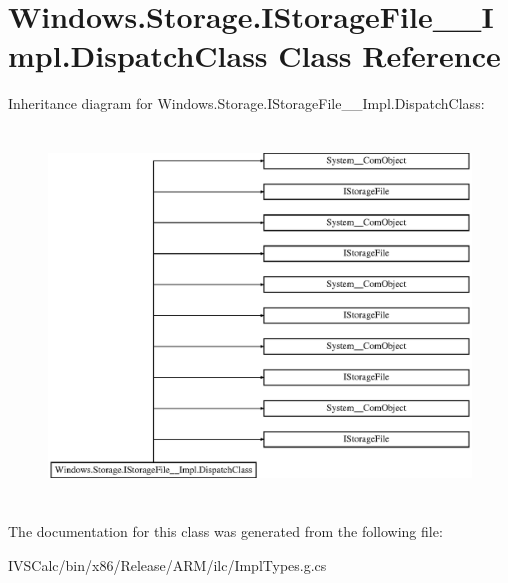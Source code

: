 \hypertarget{class_windows_1_1_storage_1_1_i_storage_file_____impl_1_1_dispatch_class}{}\section{Windows.\+Storage.\+I\+Storage\+File\+\_\+\+\_\+\+Impl.\+Dispatch\+Class Class Reference}
\label{class_windows_1_1_storage_1_1_i_storage_file_____impl_1_1_dispatch_class}
Inheritance diagram for Windows.\+Storage.\+I\+Storage\+File\+\_\+\+\_\+\+Impl.\+Dispatch\+Class\+:\begin{figure}[H]
\begin{center}
\leavevmode
\includegraphics[height=9.935484cm]{class_windows_1_1_storage_1_1_i_storage_file_____impl_1_1_dispatch_class}
\end{center}
\end{figure}


The documentation for this class was generated from the following file\+:\begin{DoxyCompactItemize}
\item 
I\+V\+S\+Calc/bin/x86/\+Release/\+A\+R\+M/ilc/Impl\+Types.\+g.\+cs\end{DoxyCompactItemize}
